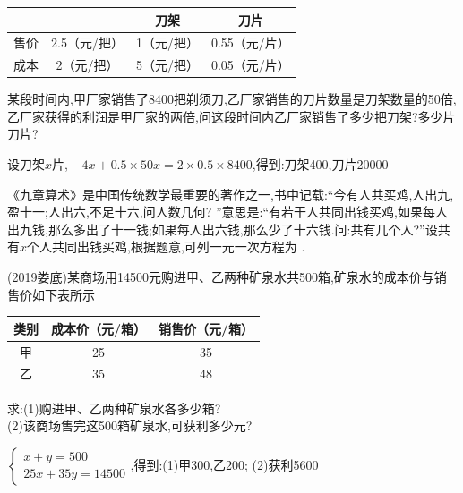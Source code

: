 \documentclass[cn,blue,12pt]{elegantbook}
\renewcommand \tkt[1]{{\CJKunderline[hidden=true, skip=true, thickness=1pt]{#1}}}
\begin{document}
\begin{zhenti}[resume]
\begin{table}[H]
\begin{tabular}{|c|c|c|c|}
\cline{3-4}          &       & 刀架    & 刀片 \bigstrut\\
    \hline
    售价    & 2.5（元/把） & 1（元/把） & 0.55（元/片） \bigstrut\\
    \hline
    成本    & 2（元/把） & 5（元/把） & 0.05（元/片） \bigstrut\\
    \hline
    \end{tabular}%
\end{table}%
某段时间内,甲厂家销售了8400把剃须刀,乙厂家销售的刀片数量是刀架数量的50倍,乙厂家获得的利润是甲厂家的两倍,问这段时间内乙厂家销售了多少把刀架?多少片刀片?
\begin{solution}
    设刀架\(x\)片, \(-4x + 0.5\times 50x = 2\times 0.5\times 8400\),得到:刀架400,刀片20000
\end{solution}
\item 《九章算术》是中国传统数学最重要的著作之一,书中记载:``今有人共买鸡,人出九,盈十一;人出六,不足十六,问人数几何? ''意思是:``有若干人共同出钱买鸡,如果每人出九钱,那么多出了十一钱;如果每人出六钱,那么少了十六钱.问:共有几个人?''设共有\(x\)个人共同出钱买鸡,根据题意,可列一元一次方程为 \tkt{ \(9x-11=6x+16\)}  .
\item  (2019娄底)某商场用14500元购进甲、乙两种矿泉水共500箱,矿泉水的成本价与销售价如下表所示
\begin{table}[H]
  \centering
    \begin{tabular}{|c|c|c|}
    \hline
    类别    & 成本价（元/箱） & 销售价（元/箱） \bigstrut\\
    \hline
    甲     & 25    & 35 \bigstrut\\
    \hline
    乙     & 35    & 48 \bigstrut\\
    \hline
    \end{tabular}%
\end{table}%
求:(1)购进甲、乙两种矿泉水各多少箱?\\
(2)该商场售完这500箱矿泉水,可获利多少元?\\
\begin{solution}
\(\begin{cases} x+y=500\\ 25x+35y=14500 \end{cases}\),得到:(1)甲300,乙200; (2)获利5600
\end{solution}
\end{zhenti}
\end{document}
